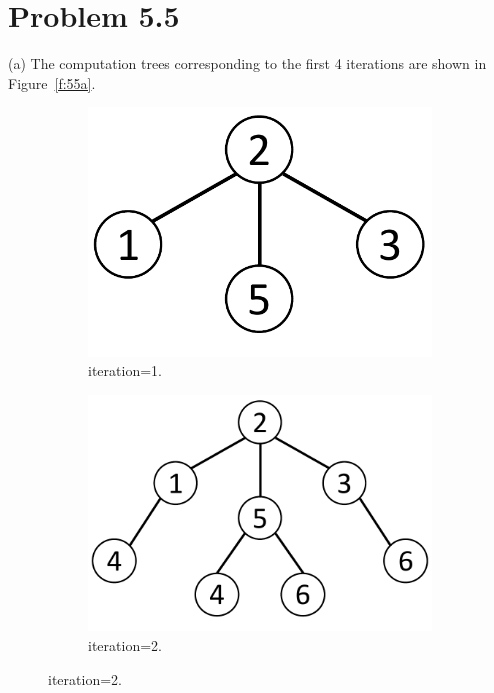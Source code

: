 \documentclass{article}
\begin{document}
\section*{Problem 5.5}
(a) The computation trees corresponding to the first 4 iterations
are shown in Figure~\ref{f:55a}.
%
\begin{figure}[h]
  \centering
	\begin{subfigure}[t]{0.15\textwidth}
	\centering
	\includegraphics[width=\textwidth]{55a1.pdf}
	\vspace{-0.6cm}
	\caption{iteration=1.}
	\end{subfigure}
		\begin{subfigure}[t]{0.23\textwidth}
	\centering
	\includegraphics[width=\textwidth]{55a2.pdf}
	\vspace{-0.6cm}
	\caption{iteration=2.}

\end{subfigure}
\end{figure}
\end{document}
